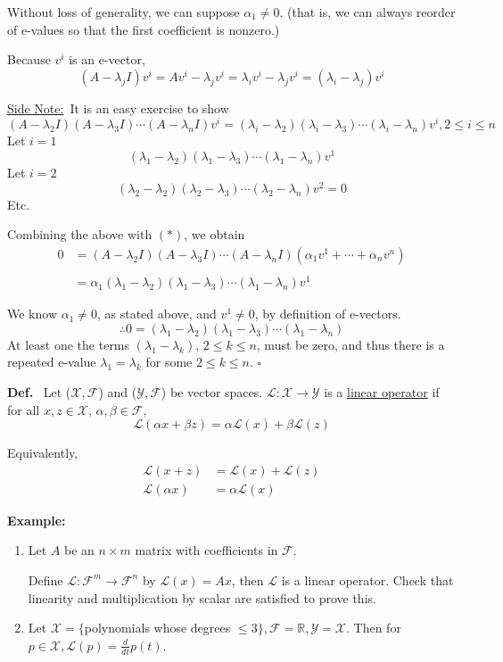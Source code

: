 \documentclass[letterpaper]{article}
\begin{document}
    \noindent Without loss of generality, we can suppose $\alpha_1 \neq 0$. (that is, we can always reorder of e-values so that the first coefficient is nonzero.)

    Because $v^i$ is an e-vector, $$(A - \lambda_j I)v^i = A v^i - \lambda_j v^i = \lambda_i v^i - \lambda_j v^i = (\lambda_i - \lambda_j) v^i$$

\underline{Side Note:}~It is an easy exercise to show $$(A - \lambda_2 I)(A - \lambda_3 I)\dotsb(A - \lambda_n I)v^i = (\lambda_i - \lambda_2)(\lambda_i - \lambda_3)\dotsb(\lambda_i - \lambda_n)v^i, 2 \leq i \leq n$$
    Let $i = 1$ $$ (\lambda_1 - \lambda_2)(\lambda_1 - \lambda_3)\dotsb(\lambda_1 - \lambda_n)v^1$$
    Let $i = 2$ $$ (\lambda_2 - \lambda_2)(\lambda_2 - \lambda_3)\dotsb(\lambda_2 - \lambda_n)v^2 = 0 $$
    Etc.

    Combining the above with $(*)$, we obtain
    \begin{align*}
        0 &= (A - \lambda_2 I)(A - \lambda_3 I)\dotsb(A - \lambda_n I)(\alpha_1 v^1 + \dotsb + \alpha_n v^n)\\
        \nonumber\\
        & = \alpha_1 (\lambda_1 - \lambda_2)(\lambda_1 - \lambda_3)\dotsb(\lambda_1 - \lambda_n)v^1
    \end{align*}

    We know $\alpha_1 \neq 0$, as stated above, and $v^1 \neq 0$, by definition of e-vectors. $$\therefore 0 = (\lambda_1 - \lambda_2)(\lambda_1 - \lambda_3)\dotsb(\lambda_1 - \lambda_n)$$
    At least one the terms $(\lambda_1-\lambda_k)$, $2 \le k \le n$, must be zero, and thus there is a repeated e-value $\lambda_1 = \lambda_k $ for some $2 \leq k \leq n$. $\square$

\noindent \textbf{Def.}~ Let ($\mathcal{X}, \mathcal{F}$) and ($\mathcal{Y}, \mathcal{F}$) be vector spaces. $\mathcal{L}: \mathcal{X} \rightarrow \mathcal{Y}$ is a \underline{linear operator} if for all $x, z \in \mathcal{X}$, $\alpha, \beta\in \mathcal{F}$, $$ \mathcal{L}(\alpha x + \beta z) = \alpha \mathcal{L}(x) + \beta \mathcal{L}(z)$$

    Equivalently,
    \begin{align*}\mathcal{L}(x + z) &= \mathcal{L}(x) + \mathcal{L}(z)\\
        \mathcal{L}(\alpha x) &= \alpha \mathcal{L}(x)
    \end{align*}

\newpage
\noindent \textbf{Example:}~
    \begin{enumerate}
        \item Let $A$ be an $n \times m$ matrix with coefficients in $\mathcal{F}$.

            Define $\mathcal{L}: \mathcal{F}^m \rightarrow \mathcal{F}^n$ by $\mathcal{L}(x) = A x$, then $\mathcal{L}$ is a linear operator. Check that linearity and multiplication by scalar are satisfied to prove this.

        \item Let $\mathcal{X} = \{ $polynomials whose degrees $\leq 3 \}, \mathcal{F} = \mathbb{R}, \mathcal{Y} = \mathcal{X}$. Then for $p \in \mathcal{X}, \mathcal{L}(p) = \frac{d}{dt} p(t)$.
    \end{enumerate}
\end{document}
